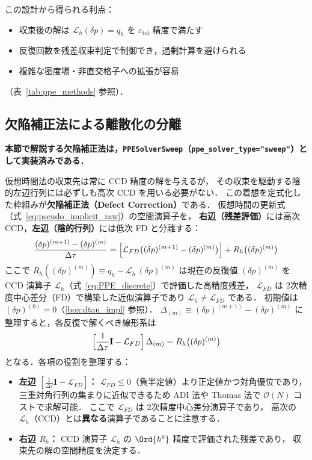 この設計から得られる利点：

\begin{itemize}
  \item 収束後の解は $\mathcal{L}_h(\delta p) = q_h$ を $\varepsilon_\text{tol}$ 精度で満たす
  \item 反復回数を残差収束判定で制御でき，過剰計算を避けられる
  \item 複雑な密度場・非直交格子への拡張が容易
\end{itemize}

（表~\ref{tab:ppe_methods} 参照）．

\subsection{欠陥補正法による離散化の分離}
\label{sec:defect_correction}

\noindent\textbf{本節で解説する欠陥補正法は，\texttt{PPESolverSweep}（\texttt{ppe\_solver\_type="sweep"}）として実装済みである．}

仮想時間法の収束先は常に CCD 精度の解を与えるが，
その収束を駆動する陰的左辺行列には必ずしも高次 CCD を用いる必要がない．
この着想を定式化した枠組みが\textbf{欠陥補正法（Defect Correction）}である．
仮想時間の更新式（式~\eqref{eq:pseudo_implicit_raw}）の空間演算子を，
\textbf{右辺（残差評価）}には高次 CCD，\textbf{左辺（陰的行列）}には低次 FD と分離する：
\begin{equation}
  \frac{(\delta p)^{(m+1)}-(\delta p)^{(m)}}{\Delta\tau}
  = \Bigl[\mathcal{L}_{FD}\bigl((\delta p)^{(m+1)}-(\delta p)^{(m)}\bigr)\Bigr]
    + R_h\bigl((\delta p)^{(m)}\bigr)
  \label{eq:defect_correction_split}
\end{equation}
ここで $R_h((\delta p)^{(m)}) \equiv q_h - \mathcal{L}_h\,(\delta p)^{(m)}$ は現在の反復値 $(\delta p)^{(m)}$
を CCD 演算子 $\mathcal{L}_h$（式~\eqref{eq:PPE_discrete}）で評価した高精度残差，
$\mathcal{L}_{FD}$ は 2次精度中心差分（FD）で構築した近似演算子であり $\mathcal{L}_h \neq \mathcal{L}_{FD}$ である．
初期値は $(\delta p)^{(0)} = 0$（\ref{box:dtau_impl} 参照）．
$\Delta_{(m)} \equiv (\delta p)^{(m+1)}-(\delta p)^{(m)}$ に整理すると，各反復で解くべき線形系は
\begin{equation}
  \Bigl[\frac{1}{\Delta\tau}\mathbf{I} - \mathcal{L}_{FD}\Bigr]\,\Delta_{(m)}
  = R_h\bigl((\delta p)^{(m)}\bigr)
  \label{eq:defect_correction_linear}
\end{equation}
となる．各項の役割を整理する：
\begin{itemize}
  \item \textbf{左辺 $[\frac{1}{\Delta\tau}\mathbf{I} - \mathcal{L}_{FD}]$：}
        $\mathcal{L}_{FD} \le 0$（負半定値）より正定値かつ対角優位であり，
        三重対角行列の集まりに近似できるため ADI 法や
        Thomas 法で $\mathcal{O}(N)$ コストで求解可能．
        ここで $\mathcal{L}_{FD}$ は 2次精度中心差分演算子であり，
        高次の $\mathcal{L}_h$（CCD）とは\textbf{異なる}演算子であることに注意する．
  \item \textbf{右辺 $R_h$：} CCD 演算子 $\mathcal{L}_h$ の $\Ord{h^6}$ 精度で評価された残差であり，
        収束先の解の空間精度を決定する．
\end{itemize}

